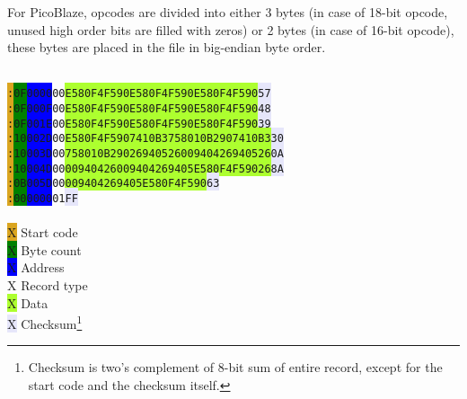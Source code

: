         For PicoBlaze, opcodes are divided into either 3 bytes (in case of 18-bit opcode, unused high order bits are filled with zeros) or 2 bytes (in case of 16-bit opcode), these bytes are placed in the file in big-endian byte order.

        ~\\
        \indent\texttt{\colorbox{Goldenrod}{:}\colorbox{green}{0F}\colorbox{blue}{0000}\colorbox{Apricot}{00}\colorbox{GreenYellow}{E580F4F590E580F4F590E580F4F590}\colorbox{Lavender}{57}}\\
        \indent\texttt{\colorbox{Goldenrod}{:}\colorbox{green}{0F}\colorbox{blue}{000F}\colorbox{Apricot}{00}\colorbox{GreenYellow}{E580F4F590E580F4F590E580F4F590}\colorbox{Lavender}{48}}\\
        \indent\texttt{\colorbox{Goldenrod}{:}\colorbox{green}{0F}\colorbox{blue}{001E}\colorbox{Apricot}{00}\colorbox{GreenYellow}{E580F4F590E580F4F590E580F4F590}\colorbox{Lavender}{39}}\\
        \indent\texttt{\colorbox{Goldenrod}{:}\colorbox{green}{10}\colorbox{blue}{002D}\colorbox{Apricot}{00}\colorbox{GreenYellow}{E580F4F5907410B3758010B2907410B3}\colorbox{Lavender}{30}}\\
        \indent\texttt{\colorbox{Goldenrod}{:}\colorbox{green}{10}\colorbox{blue}{003D}\colorbox{Apricot}{00}\colorbox{GreenYellow}{758010B2902694052600940426940526}\colorbox{Lavender}{0A}}\\
        \indent\texttt{\colorbox{Goldenrod}{:}\colorbox{green}{10}\colorbox{blue}{004D}\colorbox{Apricot}{00}\colorbox{GreenYellow}{00940426009404269405E580F4F59026}\colorbox{Lavender}{8A}}\\
        \indent\texttt{\colorbox{Goldenrod}{:}\colorbox{green}{0B}\colorbox{blue}{005D}\colorbox{Apricot}{00}\colorbox{GreenYellow}{009404269405E580F4F590}\colorbox{Lavender}{63}}\\
        \indent\texttt{\colorbox{Goldenrod}{:}\colorbox{green}{00}\colorbox{blue}{0000}\colorbox{Apricot}{01}\colorbox{Lavender}{FF}}\\\\
        \indent\colorbox{Goldenrod}{\color{Goldenrod}X} Start code\\
        \indent\colorbox{green}{\color{green}X} Byte count\\
        \indent\colorbox{blue}{\color{blue}X} Address\\
        \indent\colorbox{Apricot}{\color{Apricot}X} Record type\\
        \indent\colorbox{GreenYellow}{\color{GreenYellow}X} Data\\
        \indent\colorbox{Lavender}{\color{Lavender}X} Checksum\footnote{Checksum is two's complement of 8-bit sum of entire record, except for the start code and the checksum itself.}

